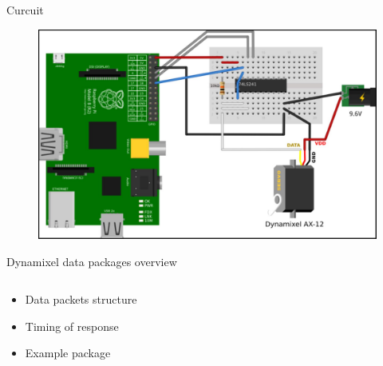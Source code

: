 \documentclass{beamer}
\begin{document}

\begin{frame}{Curcuit}

    \begin{figure}
        \centering
        \includegraphics[width = \textwidth]{img/circuit.png}
    \end{figure}
    
\end{frame}






\begin{frame}{Dynamixel data packages overview}

    \begin{columns}
        \begin{column}[]{0.5\textwidth}
            \begin{itemize}
                \item Data packets structure
                \item Timing of response
                \item Example package
            \end{itemize}
        \end{column}
        
        
        \begin{column}[]{0.5\textwidth}
        \end{column}
    \end{columns}
    
\end{frame}

\end{document}
